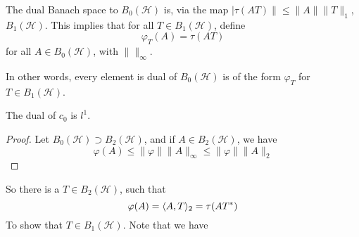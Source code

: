 \begin{theorem}
    The dual Banach space to $B_0(\mathcal{H})$ is, via the map $|\tau(AT)\|\leq \|A\|\|T\|_1$, $B_1(\mathcal{H})$. This implies that for all $T\in B_1(\mathcal{H})$, define 
    \begin{equation*}
        \varphi_T(A)=\tau(AT)
    \end{equation*}
    for all $A\in B_0(\mathcal{H})$, with $\| \|_\infty$.

    In other words, every element is dual of $B_0(\mathcal{H})$ is of the form $\varphi_T$ for $T\in B_1(\mathcal{H})$.
\end{theorem}
\begin{remark}
    The dual of $c_0$ is $l^1$.    
\end{remark}
\begin{proof}
    Let $B_0(\mathcal{H})\supset B_2(\mathcal{H})$, and if $A\in B_2(\mathcal{H})$, we have 
    \begin{equation*}
        \varphi(A)\leq\|\varphi\|\|A\|_\infty\leq\|\varphi\|\|A\|_2
    \end{equation*}
\end{proof}
So there is a $T\in B_2(\mathcal{H})$, such that 
\begin{equation*}
    \varphi(A)=\langle A, T\rangle_2=\tau(AT^*)
\end{equation*}
To show that $T\in B_1(\mathcal{H})$. Note that we have 
